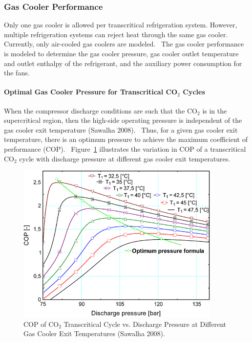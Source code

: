 \subsubsection{Gas Cooler Performance}\label{gas-cooler-performance}

Only one gas cooler is allowed per transcritical refrigeration system. However, multiple refrigeration systems can reject heat through the same gas cooler.~ Currently, only air-cooled gas coolers are modeled.~ The gas cooler performance is modeled to determine the gas cooler pressure, gas cooler outlet temperature and outlet enthalpy of the refrigerant, and the auxiliary power consumption for the fans.

\paragraph{\texorpdfstring{Optimal Gas Cooler Pressure for Transcritical CO\(_{2}\) Cycles}{Optimal Gas Cooler Pressure for Transcritical CO\_\{2\} Cycles}}\label{optimal-gas-cooler-pressure-for-transcritical-coux5f2-cycles}

When the compressor discharge conditions are such that the CO\(_{2}\) is in the supercritical region, then the high-side operating pressure is independent of the gas cooler exit temperature (Sawalha 2008).~ Thus, for a given gas cooler exit temperature, there is an optimum pressure to achieve the maximum coefficient of performance (COP).~ Figure~\ref{fig:cop-of-co_2-transcritical-cycle-vs.-discharge} illustrates the variation in COP of a transcritical CO\(_{2}\) cycle with discharge pressure at different gas cooler exit temperatures.

\begin{figure}[hbtp] %
\centering
\includegraphics[width=0.9\textwidth, height=0.9\textheight, keepaspectratio=true]{media/image6342.png}
\caption{COP of CO\(_2\) Transcritical Cycle vs. Discharge Pressure at Different Gas Cooler Exit Temperatures (Sawalha 2008). \protect \label{fig:cop-of-co_2-transcritical-cycle-vs.-discharge}}
\end{figure}

